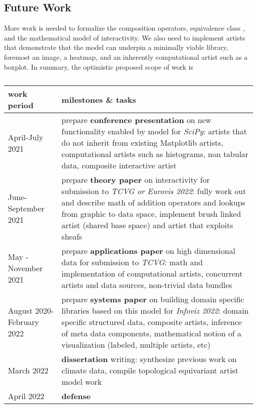 \documentclass[../main.tex]{subfiles}
\begin{document}
\subsection{Future Work}
More work is needed to formalize the composition operators, equivalence class \vartisteq, and the mathematical model of interactivity. We also need to implement artists that demonstrate that the model can underpin a minimally viable library, foremost an image\cite{haber1990visualization,hansen2011visualization}, a heatmap\cite{wilkinsonHistoryClusterHeat2009,loua1873atlas}, and an inherently computational artist such as a boxplot\cite{wickham40YearsBoxplots2011}. In summary, the optimistic proposed scope of work is

\begin{table}[H]
    \centering
    \renewcommand{\arraystretch}{2}
    \begin{tabulary}{\textwidth}{|l|L|}\hline
    \textbf{work period} & \textbf{milestones \& tasks} \\ \hline
    April-July 2021 & prepare \textbf{conference presentation} on new functionality enabled by model for \textit{SciPy}: artists that do not inherit from existing Matplotlib artists, computational artists such as histograms, non tabular data, composite interactive artist \\ \hline
    June-September 2021  & prepare \textbf{theory paper} on interactivity for submission to \textit{TCVG or Eurovis 2022}: fully work out and describe math of addition operators and lookups from graphic to data space, implement brush linked artist (shared base space) and artist that exploits sheafs \\ \hline
    May - November 2021 & prepare \textbf{applications paper} on high dimensional data for submission to \textit{TCVG}: math and implementation of computational artists, concurrent artists and data sources, non-trivial data bundles \\ \hline 
    August 2020-February 2022 & prepare \textbf{systems paper} on building domain specific libraries based on this model for \textit{Infoviz 2022}: domain specific structured data, composite artists, inference of meta data components, mathematical notion of a visualization (labeled, multiple artists, etc)\\ \hline
    March 2022 & \textbf{dissertation} writing: synthesize previous work on climate data, compile topological equivariant artist model work \\ \hline
    April 2022 & \textbf{defense} \\ \hline
    \end{tabulary}
    \caption{}
    \label{tab:code:schedule}
\end{table}
\end{document}
